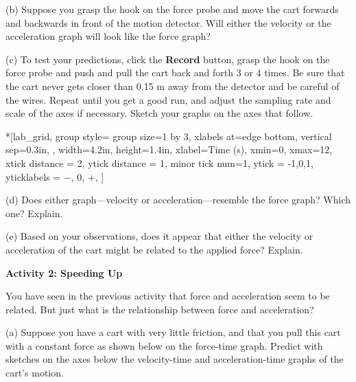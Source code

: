 \newpage
(b) Suppose you grasp the hook on the force probe and move the cart forwards
and backwards in front of the motion detector. Will either the
velocity or the acceleration graph will look like the force graph? 
\answerspace{8mm}

\pagebreak[3]
(c) To test your predictions, click the \textbf{Record} button, grasp the
hook on the force probe and push and pull the cart back and forth 3 or 4 times. Be sure that
the cart never gets closer than 0.15 m away from the detector and be careful
of the wires. Repeat until you get a good run, and adjust the sampling rate 
and scale of the axes if necessary. Sketch your graphs on the axes that follow.


\begin{lab_groupplot}*{}[lab_grid,
	group style={
		group size=1 by 3,
		xlabels at=edge bottom,
		vertical sep=0.3in,
		},
	width=4.2in,  height=1.4in,
	xlabel=Time (s),
	xmin=0, xmax=12,
	xtick distance = 2, 
	ytick distance = 1, 
	minor tick num=1,
	ytick = {-1,0,1},
	yticklabels = {$-$, 0, $+$},
	]
\nextgroupplot[
	ymin=-1,ymax=1, 
	ylabel={Velocity (m/s)},
	]
\nextgroupplot[
	ymin=-1,ymax=1, 
	ylabel={Acceleration (m/s$^2$)},
	]
\nextgroupplot[
	ymin=-1,ymax=1, 
	ylabel={Force (N)},
	]
\end{lab_groupplot}

(d) Does either graph---velocity or acceleration---resemble the force graph? Which
one? Explain.
\answerspace{10mm}

(e) Based on your observations, does it appear that either the velocity or acceleration
of the cart might be related to the applied force? Explain.
\answerspace{10mm}

\pagebreak[3]
\textbf{Activity 2: Speeding Up }

You have seen in the previous activity that force and acceleration seem to be
related. But just what is the relationship between force and acceleration? 

(a) Suppose you have a cart with very little friction, and that you pull this
cart with a constant force as shown below on the force-time graph. Predict with sketches on
the axes below the velocity-time and acceleration-time graphs of the cart's motion.

